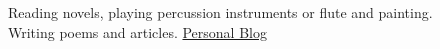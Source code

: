 Reading novels, playing percussion instruments or flute and painting.\\ Writing poems and articles. \href{http://megh-ud.blogspot.com/}{Personal Blog}
